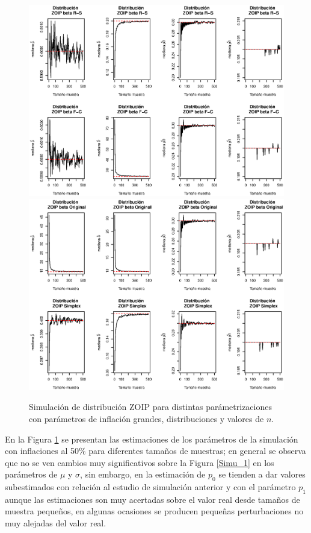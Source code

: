 \begin{figure}
	\begin{center}
		\includegraphics[scale=0.55]{Simulacion_RS_FC_Infla.eps}
		\quad
		\includegraphics[scale=0.55]{Simulacion_Ori_Sim_Infla.eps}	
		\caption{Simulaci\'{o}n de distribuci\'{o}n ZOIP para distintas par\'{a}metrizaciones con pa\-r\'{a}\-me\-tros de inflaci\'{o}n grandes, distribuciones y valores de $n$.}
		\label{Simu_2}
	\end{center}
\end{figure}

En la Figura \ref{Simu_2} se presentan las estimaciones de los par\'{a}metros de la simulaci\'{o}n con inflaciones al 50\% para diferentes tama\~{n}os de muestras; en general se observa que no se ven cambios muy significativos sobre la Figura \ref{Simu_1} en los par\'{a}metros de $\mu$ y $\sigma$, sin embargo, en la estimaci\'{o}n de $p_0$ se tienden a dar valores subestimados con relaci\'{o}n al estudio de simulaci\'{o}n anterior y con el par\'{a}metro $p_1$ aunque las estimaciones son muy acertadas sobre el valor real desde tama\~{n}os de muestra peque\~{n}os, en algunas ocasiones se producen peque\~{n}as perturbaciones no muy alejadas del valor real.



